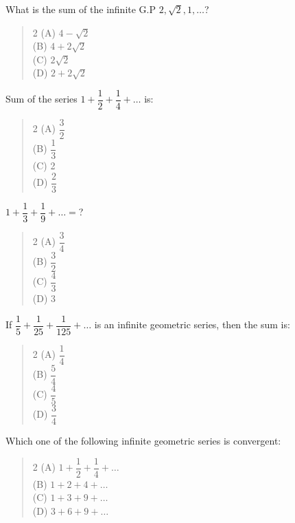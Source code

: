 \documentclass[11pt,a4paper]{article}
\begin{document}
\begin{mcqlist}
\item What is the sum of the infinite G.P $2,\sqrt{2},1,\ldots$?
\begin{quote}\begin{multicols}{2}
\noindent (A) $4-\sqrt{2}$ \\
(B) $4+2\sqrt{2}$ \\
(C) $2\sqrt{2}$ \\
(D) $2+2\sqrt{2}$
\end{multicols}\end{quote}

\item Sum of the series $1+\dfrac{1}{2}+\dfrac{1}{4}+\ldots$ is:
\begin{quote}\begin{multicols}{2}
\noindent (A) $\dfrac{3}{2}$ \\
(B) $\dfrac{1}{3}$ \\
(C) 2 \\
(D) $\dfrac{2}{3}$
\end{multicols}\end{quote}

\item $1+\dfrac{1}{3}+\dfrac{1}{9}+\ldots=$?
\begin{quote}\begin{multicols}{2}
\noindent (A) $\dfrac{3}{4}$ \\
(B) $\dfrac{3}{2}$ \\
(C) $\dfrac{4}{3}$ \\
(D) 3
\end{multicols}\end{quote}

\item If $\dfrac{1}{5}+\dfrac{1}{25}+\dfrac{1}{125}+\ldots$ is an infinite geometric series, then the sum is:
\begin{quote}\begin{multicols}{2}
\noindent (A) $\dfrac{1}{4}$ \\
(B) $\dfrac{5}{4}$ \\
(C) $\dfrac{4}{5}$ \\
(D) $\dfrac{3}{4}$
\end{multicols}\end{quote}

\item Which one of the following infinite geometric series is convergent:
\begin{quote}\begin{multicols}{2}
\noindent (A) $1+\dfrac{1}{2}+\dfrac{1}{4}+\ldots$ \\
(B) $1+2+4+\ldots$ \\
(C) $1+3+9+\ldots$ \\
(D) $3+6+9+\ldots$
\end{multicols}\end{quote}


\end{mcqlist}
\end{document}
